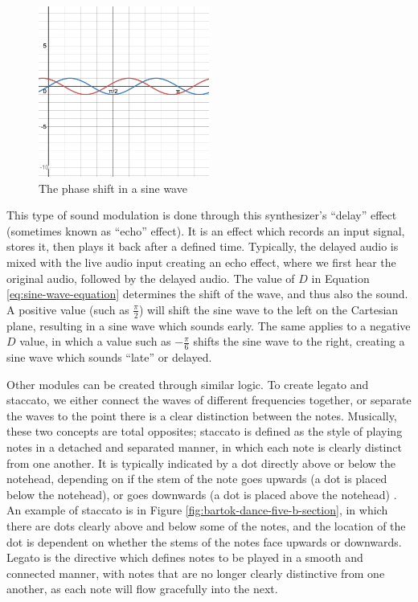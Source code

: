 \begin{figure}[ht]
	\centering
	\includegraphics[width=0.5\textwidth]{figures/sine-wave-phase-shift.png}
	\caption{The phase shift in a sine wave}
	\label{fig:sine-wave-phase-shift}
\end{figure}


This type of sound modulation is done through this synthesizer's ``delay'' effect (sometimes known as ``echo'' effect). It is an effect which records an input signal, stores it, then plays it back after a defined time. Typically, the delayed audio is mixed with the live audio input creating an echo effect, where we first hear the original audio, followed by the delayed audio. The value of $D$ in Equation \ref{eq:sine-wave-equation} determines the shift of the wave, and thus also the sound. A positive value (such as $\frac{\pi}{2}$) will shift the sine wave to the left on the Cartesian plane, resulting in a sine wave which sounds early. The same applies to a negative $D$ value, in which a value such as $-\frac{\pi}{6}$ shifts the sine wave to the right, creating a sine wave which sounds ``late'' or delayed.

Other modules can be created through similar logic. To create legato and staccato, we either connect the waves of different frequencies together, or separate the waves to the point there is a clear distinction between the notes. Musically, these two concepts are total opposites; staccato is defined as the style of playing notes in a detached and separated manner, in which each note is clearly distinct from one another. It is typically indicated by a dot directly above or below the notehead, depending on if the stem of the note goes upwards (a dot is placed below the notehead), or goes downwards (a dot is placed above the notehead) \cite{Burkholder_Grout_Palisca_2014}. An example of staccato is in Figure \ref{fig:bartok-dance-five-b-section}, in which there are dots clearly above and below some of the notes, and the location of the dot is dependent on whether the stems of the notes face upwards or downwards. Legato is the directive which defines notes to be played in a smooth and connected manner, with notes that are no longer clearly distinctive from one another, as each note will flow gracefully into the next.


